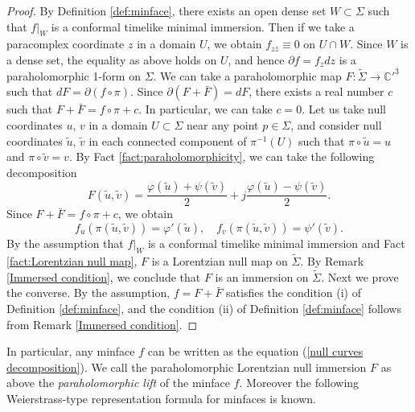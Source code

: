 \documentclass[11pt,reqno]{amsart}
\theoremstyle{plain} %
\theoremstyle{definition}
\begin{document}
\begin{proof}
By Definition \ref{def:minface}, there exists an open dense set $W\subset \Sigma$ such that $f|_W$ is a conformal timelike minimal immersion. Then if we take a paracomplex coordinate $z$ in a domain $U$, we  obtain $f_{z\bar{z}}\equiv 0$ on $U\cap W$. Since $W$ is a dense set, the equality as above holds on $U$, and hence $\partial f=f_zdz$ is a paraholomorphic 1-form on $\Sigma$. We can take a paraholomorphic map $F: \tilde{\Sigma} \longrightarrow {\mathbb{C}'}^3$ such that $dF=\partial(f\circ\pi)$. Since $\partial(F+\bar{F})=dF$, there exists a real number $c$ such that $F+\bar{F}=f\circ\pi+c$. In particular, we can take $c=0$. Let us take null coordinates $u$, $v$ in a domain $U\subset \Sigma$ near any point $p\in \Sigma$, and consider null coordinates $\tilde{u}$, $\tilde{v}$ in each connected component of $\pi^{-1}(U)$ such that $\pi \circ \tilde{u}=u$ and $\pi \circ \tilde{v}=v$. By Fact \ref{fact:paraholomorphicity}, we can take the following decomposition
\begin{equation*}
F(\tilde{u}, \tilde{v})=\frac{\varphi(\tilde{u})+\psi(\tilde{v})}{2}+j\frac{\varphi(\tilde{u})-\psi(\tilde{v})}{2}.
\end{equation*}
Since $F+\bar{F}=f\circ\pi+c$, we obtain
\begin{equation*}
f_u(\pi(\tilde{u},\tilde{v}))=\varphi'(\tilde{u}),\quad f_v(\pi(\tilde{u},\tilde{v}))=\psi'(\tilde{v}).
\end{equation*}
By the assumption that $f|_W$ is a conformal timelike minimal immersion and Fact \ref{fact:Lorentzian null map}, $F$ is a Lorentzian null map on $\tilde{\Sigma}$. By Remark \ref{Immersed condition}, we conclude that $F$ is an immersion on $\tilde{\Sigma}$. Next we prove the converse. By the assumption, $f=F+\bar{F}$ satisfies the condition (i) of Definition \ref{def:minface}, and the condition (ii) of Definition \ref{def:minface} follows from Remark \ref{Immersed condition}.
\end{proof}

In particular, any minface $f$ can be written as the equation (\ref{null curves decomposition}). 
We call the paraholomorphic Lorentzian null immersion $F$ as above the {\it paraholomorphic lift} of the minface $f$. Moreover the following Weierstrass-type representation formula for minfaces is known.
\end{document}
